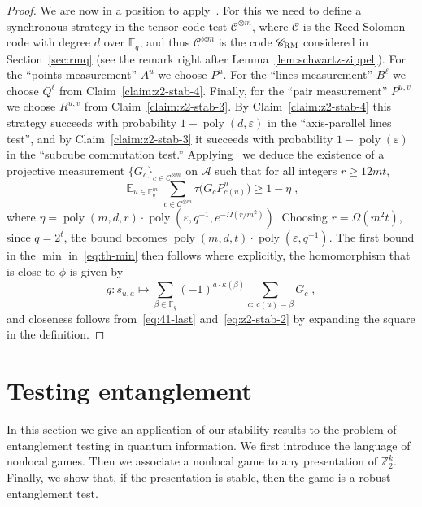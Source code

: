 \documentclass[11pt]{article}
\theoremstyle{definition}
\newcommand{\code}{\mathscr{C}}
\DeclareMathOperator*{\Expectation}{\mathbb{E}}
\newcommand{\Es}[1]{\Expectation_{#1}}
\newcommand{\F}{\ensuremath{\mathbb{F}}}
\newcommand{\Z}{\ensuremath{\mathbb{Z}}}
\newcommand{\mA}{\ensuremath{\mathcal{A}}}
\newcommand{\RM}{\ensuremath{\textsc{RM}}}
\DeclareMathOperator{\poly}{poly}
\newcommand{\eps}{\varepsilon}
\begin{document}
\begin{proof}
We are now in a position to apply~\cite[Theorem 4.1]{ji2022quantum}. For this we need to define a synchronous strategy in the tensor code test $\code^{\otimes m}$, where $\code$ is the Reed-Solomon code with degree $d$ over $\F_q$, and thus $\code^{\otimes m}$ is the code $\code_\RM$ considered in Section~\ref{sec:rmq} (see the remark right after Lemma~\ref{lem:schwartz-zippel}). For the ``points measurement'' $A^u$ we choose $P^u$. For the ``lines measurement'' $B^\ell$ we choose $Q^\ell$ from Claim~\ref{claim:z2-stab-4}. Finally, for the ``pair measurement'' $P^{u,v}$ we choose $R^{u,v}$ from Claim~\ref{claim:z2-stab-3}. By Claim~\ref{claim:z2-stab-4} this strategy succeeds with probability $1-\poly(d,\eps)$ in the ``axis-parallel lines test'', and by Claim~\ref{claim:z2-stab-3} it succeeds with probability $1-\poly(\eps)$ in the ``subcube commutation test.'' Applying~\cite[Theorem 4.1]{ji2022quantum} we deduce the existence of a projective measurement $\{G_c\}_{c\in\code^{\otimes m}}$ on $\mA$ such that for all integers $r \geq 12mt$,
\begin{equation}\label{eq:41-last}
 \Es{u\in\F_q^m} \sum_{c\in\code^{\otimes m}} \tau\big( G_c P^u_{c(u)}\big) \geq 1-\eta\;,
\end{equation}
where $\eta = \poly(m,d,r) \cdot\poly(\eps,q^{-1},e^{-\Omega(r/m^2)})$. Choosing $r=\Omega(m^2 t)$, since $q=2^{t}$, the bound becomes $\poly(m,d,t) \cdot\poly(\eps,q^{-1})$. The first bound in the $\min$ in~\eqref{eq:th-min} then follows where explicitly, the homomorphism that is close to $\phi$ is given by
\[ g: s_{u,a} \mapsto \sum_{\beta\in\F_q} (-1)^{a\cdot \kappa(\beta)} \sum_{c:\ c(u)=\beta} G_c \;,\]
and closeness follows from~\eqref{eq:41-last} and~\eqref{eq:z2-stab-2} by expanding the square in the definition.
\end{proof}


\section{Testing entanglement}
\label{sec:quantum}

In this section we give an application of our stability results to the problem of entanglement testing in quantum information. We first introduce the language of nonlocal games. Then we associate a nonlocal game to any presentation of $\Z_2^k$. Finally, we show that, if the presentation is stable, then the game is a robust  entanglement test. 
	
\end{document}
